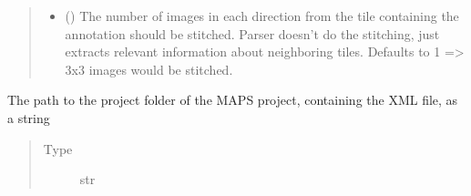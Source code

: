 \documentclass[letterpaper,10pt,english]{sphinxmanual}
\begin{document}
\begin{fulllineitems}
\begin{quote}
\begin{description}
\begin{itemize}
\item {} 
 () \textendash{} The number of images in each direction from the tile containing the annotation should be
stitched. Parser doesn’t do the stitching, just extracts relevant information about neighboring tiles.
Defaults to 1 =\textgreater{} 3x3 images would be stitched.

\end{itemize}

\end{description}\end{quote}

\begin{fulllineitems}
\label{\detokenize{index:sites_of_interest_parser.MapsXmlParser.project_folder_path}}
The path to the project folder of the MAPS project, containing the XML file, as a
string
\begin{quote}\begin{description}
\item[{Type}] \leavevmode
str

\end{description}\end{quote}

\end{fulllineitems}



\end{fulllineitems}
\end{document}
